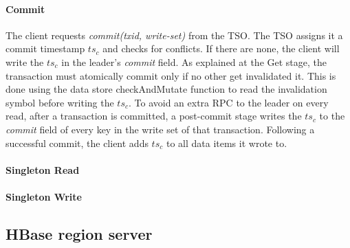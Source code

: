\paragraph{Commit}
The client requests \emph{commit(txid, write-set)} from the TSO. The TSO assigns it a commit timestamp $ts_c$ and checks for conflicts. If there are none, the client will write the $ts_c$ in the leader's \emph{commit} field. As explained at the Get stage, the transaction must atomically commit only if no other get invalidated it. This is done using the data store checkAndMutate function to read the invalidation symbol before writing the $ts_c$.
To avoid an extra RPC to the leader on every read, after a transaction is committed, a post-commit stage writes the $ts_c$ to the \emph{commit} field of every key in the write set of that transaction. 
Following a successful commit, the client adds $ts_c$ to all data items it wrote to.

\paragraph{Singleton Read}
\paragraph{Singleton Write}



\subsection{HBase region server}
\label{ssec:hbase}

